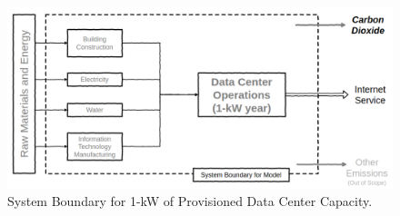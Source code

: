 \begin{figure}[h!]\centering
    \includegraphics[scale=0.4]{main-chapters/images/system_boundary.png}
    \caption[System Boundary Diagram]{System Boundary for 1-kW of Provisioned Data Center Capacity.}
    \label{system_boundary}
    \end{figure}
